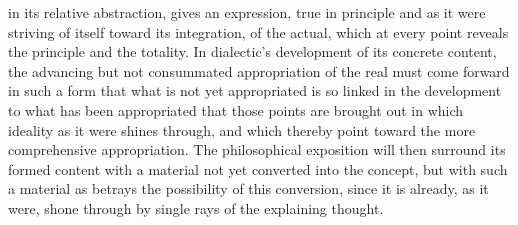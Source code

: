 in its relative abstraction, gives an expression, true in principle and
as it were striving of itself toward its integration, of the actual,
which at every point reveals the principle and the totality. In
dialectic's development of its concrete content, the advancing but not
consummated appropriation of the real must come forward in such a form
that what is not yet appropriated is so linked in the development to
what has been appropriated that those points are brought out in which
ideality as it were shines through, and which thereby point toward the
more comprehensive appropriation. The philosophical exposition will
then surround its formed content with a material not yet converted into
the concept, but with such a material as betrays the possibility of
this conversion, since it is already, as it were, shone through by
single rays of the explaining thought.

